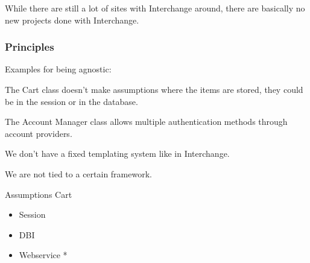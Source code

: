 





While there are still a lot of sites with Interchange around,
there are basically no new projects done with Interchange.

\subsubsection{Principles}
Examples for being agnostic:

The Cart class doesn't make assumptions where the items are
stored, they could be in the session or in the database.

The Account Manager class allows multiple authentication
methods through account providers.

We don't have a fixed templating system like in Interchange.

We are not tied to a certain framework.

\begin{frame}{Assumptions}
Cart
\begin{itemize}
\item Session
\item DBI
\item Webservice *
\end{itemize}
\end{frame}

